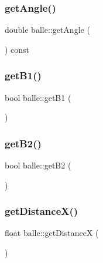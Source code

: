 \subsubsection{\texorpdfstring{get\+Angle()}{getAngle()}}
{\footnotesize\ttfamily double balle\+::get\+Angle (\begin{DoxyParamCaption}{ }\end{DoxyParamCaption}) const}

\mbox{\label{classballe_a4a4b1a63e53cd0d766fce1e49cc07b17}} 
\subsubsection{\texorpdfstring{get\+B1()}{getB1()}}
{\footnotesize\ttfamily bool balle\+::get\+B1 (\begin{DoxyParamCaption}{ }\end{DoxyParamCaption})}

\mbox{\label{classballe_a87d391536126876825f2e6b57453b973}} 
\subsubsection{\texorpdfstring{get\+B2()}{getB2()}}
{\footnotesize\ttfamily bool balle\+::get\+B2 (\begin{DoxyParamCaption}{ }\end{DoxyParamCaption})}

\mbox{\label{classballe_a3bc8bc6662c95bd052f02dfb18892209}} 
\subsubsection{\texorpdfstring{get\+Distance\+X()}{getDistanceX()}}
{\footnotesize\ttfamily float balle\+::get\+DistanceX (\begin{DoxyParamCaption}{ }\end{DoxyParamCaption})}

\mbox{\label{classballe_a086e3e6d1814e885c849e8ea4813a0a2}} 
